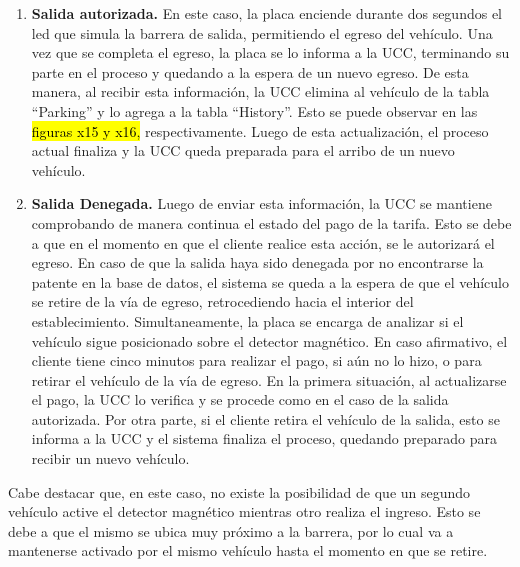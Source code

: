 \begin{enumerate}
	\item \textbf{Salida autorizada.} En este caso, la placa enciende durante dos segundos el led que simula la barrera de salida, permitiendo el egreso del vehículo. Una vez que se completa el egreso, la placa se lo informa a la UCC, terminando su parte en el proceso y quedando a la espera de un nuevo egreso. De esta manera, al recibir esta información, la UCC elimina al vehículo de la tabla “Parking” y lo agrega a la tabla “History”. Esto se puede observar en las \hl{figuras x15 y x16,} respectivamente. Luego de esta actualización, el proceso actual finaliza y la UCC queda preparada para el arribo de un nuevo vehículo.
	
	
	
	
	\item \textbf{Salida Denegada.} Luego de enviar esta información, la UCC se mantiene comprobando de manera continua el estado del pago de la tarifa. Esto se debe a que en el momento en que el cliente realice esta acción, se le autorizará el egreso. En caso de que la salida haya sido denegada por no encontrarse la patente en la base de datos, el sistema se queda a la espera de que el vehículo se retire de la vía de egreso, retrocediendo hacia el interior del establecimiento. Simultaneamente, la placa se encarga de analizar si el vehículo sigue posicionado sobre el detector magnético. En caso afirmativo, el cliente tiene cinco minutos para realizar el pago, si aún no lo hizo, o para retirar el vehículo de la vía de egreso. En la primera situación, al actualizarse el pago, la UCC lo verifica y se procede como en el caso de la salida autorizada. Por otra parte, si el cliente retira el vehículo de la salida, esto se informa a la UCC y el sistema finaliza el proceso, quedando preparado para recibir un nuevo vehículo.
\end{enumerate}

Cabe destacar que, en este caso, no existe la posibilidad de que un segundo vehículo active el detector magnético mientras otro realiza el ingreso. Esto se debe a que el mismo se ubica muy próximo a la barrera, por lo cual va a mantenerse activado por el mismo vehículo hasta el momento en que se retire.



